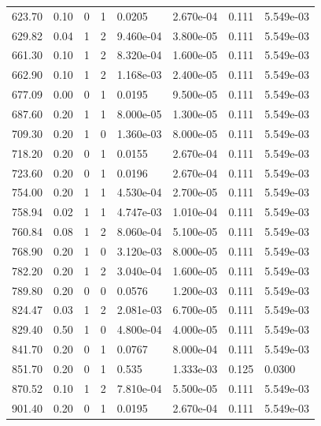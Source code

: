 \documentclass[preview]{standalone}
\begin{document}
{{{\begin{tabular}{L{1.2cm}C{1.2cm} C{0.3cm}C{0.5cm} C{1.4cm}C{1.4cm} C{1.4cm}C{1.4cm}}
  623.70  &  0.10  & 0     &  1 &  0.0205  & 2.670e-04  & 0.111 &  5.549e-03   \\ 
  629.82  &  0.04  & 1     &  2 &  9.460e-04  & 3.800e-05  & 0.111 &  5.549e-03   \\ 
  661.30  &  0.10  & 1     &  2 &  8.320e-04  & 1.600e-05  & 0.111 &  5.549e-03   \\ 
  662.90  &  0.10  & 1     &  2 &  1.168e-03  & 2.400e-05  & 0.111 &  5.549e-03   \\ 
  677.09  &  0.00  & 0     &  1 &  0.0195  & 9.500e-05  & 0.111 &  5.549e-03   \\ 
  687.60  &  0.20  & 1     &  1 &  8.000e-05  & 1.300e-05  & 0.111 &  5.549e-03   \\ 
  709.30  &  0.20  & 1     &  0 &  1.360e-03  & 8.000e-05  & 0.111 &  5.549e-03   \\ 
  718.20  &  0.20  & 0     &  1 &  0.0155  & 2.670e-04  & 0.111 &  5.549e-03   \\ 
  723.60  &  0.20  & 0     &  1 &  0.0196  & 2.670e-04  & 0.111 &  5.549e-03   \\ 
  754.00  &  0.20  & 1     &  1 &  4.530e-04  & 2.700e-05  & 0.111 &  5.549e-03   \\ 
  758.94  &  0.02  & 1     &  1 &  4.747e-03  & 1.010e-04  & 0.111 &  5.549e-03   \\ 
  760.84  &  0.08  & 1     &  2 &  8.060e-04  & 5.100e-05  & 0.111 &  5.549e-03   \\ 
  768.90  &  0.20  & 1     &  0 &  3.120e-03  & 8.000e-05  & 0.111 &  5.549e-03   \\ 
  782.20  &  0.20  & 1     &  2 &  3.040e-04  & 1.600e-05  & 0.111 &  5.549e-03   \\ 
  789.80  &  0.20  & 0     &  0 &  0.0576  & 1.200e-03  & 0.111 &  5.549e-03   \\ 
  824.47  &  0.03  & 1     &  2 &  2.081e-03  & 6.700e-05  & 0.111 &  5.549e-03   \\ 
  829.40  &  0.50  & 1     &  0 &  4.800e-04  & 4.000e-05  & 0.111 &  5.549e-03   \\ 
  841.70  &  0.20  & 0     &  1 &  0.0767  & 8.000e-04  & 0.111 &  5.549e-03   \\ 
  851.70  &  0.20  & 0     &  1 &  0.535  & 1.333e-03  & 0.125 &  0.0300   \\ 
  870.52  &  0.10  & 1     &  2 &  7.810e-04  & 5.500e-05  & 0.111 &  5.549e-03   \\ 
  901.40  &  0.20  & 0     &  1 &  0.0195  & 2.670e-04  & 0.111 &  5.549e-03   \\ 

\end{tabular}}}}
\end{document}
